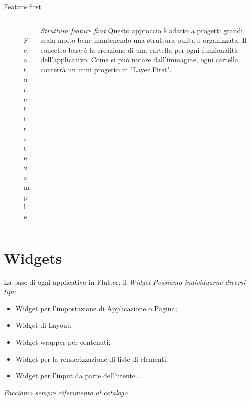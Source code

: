 \documentclass{../libs/presentation_format}
\begin{document}
\begin{frame}{Feature first}
	\begin{minipage}[0.2\textheight]{\textwidth}
		\begin{columns}[T]
			\begin{column}{0.4\textwidth}
				\begin{figure}[htpb]
					\centering
					\includegraphics[width=4cm]{../libs/feature-first-tree}
					\caption{Feature first example \cite{scalableFolder}}
					\label{fig: Feature first example}
				\end{figure}
			\end{column}
			\begin{column}{0.6\textwidth}
				\emph{Struttura feature first}
				\newline
				Questo approccio è adatto a progetti grandi, scala molto bene mantenendo una struttura pulita e organizzata.
				Il concetto base è la creazione di una cartella per ogni funzionalità dell'applicativo.
				Come si può notare dall'immagine, ogni cartella conterrà un mini progetto in "Layer First".
			\end{column}
		\end{columns}
	\end{minipage}
\end{frame}


\section{Widgets}
\begin{frame}{La base di ogni applicativo in Flutter: il \emph{Widget}}
	\emph{Possiamo individuarne diversi tipi:}
	\begin{itemize}
		\item Widget per l'impostazione di Applicazione o Pagina;
		\item Widget di Layout;
		\item Widget wrapper per contenuti;
		\item Widget per la renderizzazione di liste di elementi;
		\item Widget per l'input da parte dell'utente...
	\end{itemize}
	\emph{Facciamo sempre riferimento al catalogo}
	\newline
	\centering
	\href{https://docs.flutter.dev/development/ui/widgets}{}
\end{frame}
\end{document}
